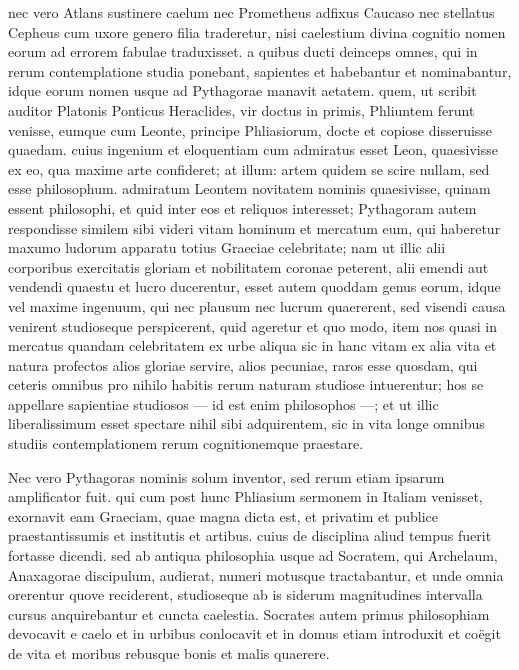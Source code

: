 

nec vero Atlans sustinere caelum nec Prometheus adfixus Caucaso nec stellatus Cepheus cum uxore genero filia traderetur, nisi caelestium divina cognitio nomen eorum ad errorem fabulae traduxisset. a quibus ducti deinceps omnes, qui in rerum contemplatione studia ponebant, sapientes et habebantur et nominabantur, idque eorum nomen usque ad Pythagorae manavit aetatem. quem, ut scribit auditor Platonis Ponticus Heraclides, vir doctus in primis, Phliuntem ferunt venisse, eumque cum Leonte, principe Phliasiorum, docte et copiose disseruisse quaedam. cuius ingenium et eloquentiam cum admiratus esset Leon, quaesivisse ex eo, qua maxime arte confideret; at illum: artem quidem se scire nullam, sed esse philosophum. admiratum Leontem novitatem nominis quaesivisse, quinam essent philosophi, et quid inter eos et reliquos interesset; Pythagoram autem respondisse similem sibi videri vitam hominum et mercatum eum, qui haberetur maxumo ludorum apparatu totius Graeciae celebritate; nam ut illic alii corporibus exercitatis gloriam et nobilitatem coronae peterent, alii emendi aut vendendi quaestu et lucro ducerentur, esset autem quoddam genus eorum, idque vel maxime ingenuum, qui nec plausum nec lucrum quaererent, sed visendi causa venirent studioseque perspicerent, quid ageretur et quo modo, item nos quasi in mercatus quandam celebritatem ex urbe aliqua sic in hanc vitam ex alia vita et natura profectos alios gloriae servire, alios pecuniae, raros esse quosdam, qui ceteris omnibus pro nihilo habitis rerum naturam studiose intuerentur; hos se appellare sapientiae studiosos — id est enim philosophos —; et ut illic liberalissimum esset spectare nihil sibi adquirentem, sic in vita longe omnibus studiis contemplationem rerum cognitionemque praestare.

Nec vero Pythagoras nominis solum inventor, sed rerum etiam ipsarum amplificator fuit. qui cum post hunc Phliasium sermonem in Italiam venisset, exornavit eam Graeciam, quae magna dicta est, et privatim et publice praestantissumis et institutis et artibus. cuius de disciplina aliud tempus fuerit fortasse dicendi. sed ab antiqua philosophia usque ad Socratem, qui Archelaum, Anaxagorae discipulum, audierat, numeri motusque tractabantur, et unde omnia orerentur quove reciderent, studioseque ab is siderum magnitudines intervalla cursus anquirebantur et cuncta caelestia. Socrates autem primus philosophiam devocavit e caelo et in urbibus conlocavit et in domus etiam introduxit et coëgit de vita et moribus rebusque bonis et malis quaerere.

